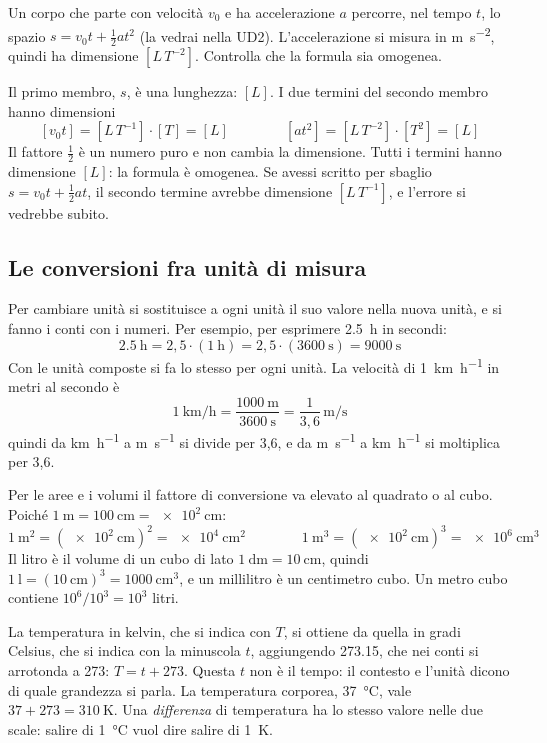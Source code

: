 \begin{esempio}
Un corpo che parte con velocità $v_0$ e ha accelerazione $a$ percorre, nel tempo $t$, lo spazio $s = v_0 t + \frac{1}{2} a t^{2}$ (la vedrai nella UD2). L'accelerazione si misura in \si{\metre\per\second\squared}, quindi ha dimensione $[L\,T^{-2}]$. Controlla che la formula sia omogenea.

Il primo membro, $s$, è una lunghezza: $[L]$. I due termini del secondo membro hanno dimensioni
\[
  [v_0 t] = [L\,T^{-1}] \cdot [T] = [L]
  \qquad\qquad
  [a t^{2}] = [L\,T^{-2}] \cdot [T^{2}] = [L]
\]
Il fattore $\frac{1}{2}$ è un numero puro e non cambia la dimensione. Tutti i termini hanno dimensione $[L]$: la formula è omogenea. Se avessi scritto per sbaglio $s = v_0 t + \frac{1}{2} a t$, il secondo termine avrebbe dimensione $[L\,T^{-1}]$, e l'errore si vedrebbe subito.
\end{esempio}

\subsection{Le conversioni fra unità di misura}

Per cambiare unità si sostituisce a ogni unità il suo valore nella nuova unità, e si fanno i conti con i numeri. Per esempio, per esprimere \SI{2,5}{\hour} in secondi:
\[
  \SI{2,5}{\hour} = 2{,}5 \cdot (\SI{1}{\hour}) = 2{,}5 \cdot (\SI{3600}{\second}) = \SI{9000}{\second}
\]
Con le unità composte si fa lo stesso per ogni unità. La velocità di \SI{1}{\kilo\metre\per\hour} in metri al secondo è
\[
  \SI{1}{\kilo\metre\per\hour} = \frac{\SI{1000}{\metre}}{\SI{3600}{\second}} = \frac{1}{3{,}6}\,\si{\metre\per\second}
\]
quindi da \si{\kilo\metre\per\hour} a \si{\metre\per\second} si divide per 3,6, e da \si{\metre\per\second} a \si{\kilo\metre\per\hour} si moltiplica per 3,6.

Per le aree e i volumi il fattore di conversione va elevato al quadrato o al cubo. Poiché $\SI{1}{\metre} = \SI{100}{\centi\metre} = \SI{e2}{\centi\metre}$:
\[
  \SI{1}{\metre\squared} = (\SI{e2}{\centi\metre})^{2} = \SI{e4}{\centi\metre\squared}
  \qquad\qquad
  \SI{1}{\metre\cubed} = (\SI{e2}{\centi\metre})^{3} = \SI{e6}{\centi\metre\cubed}
\]
Il litro è il volume di un cubo di lato $\SI{1}{\deci\metre} = \SI{10}{\centi\metre}$, quindi $\SI{1}{\litre} = (\SI{10}{\centi\metre})^{3} = \SI{1000}{\centi\metre\cubed}$, e un millilitro è un centimetro cubo. Un metro cubo contiene $10^{6}/10^{3} = 10^{3}$ litri.

La temperatura in kelvin, che si indica con $T$, si ottiene da quella in gradi Celsius, che si indica con la minuscola $t$, aggiungendo \num{273,15}, che nei conti si arrotonda a 273: $T = t + 273$. Questa $t$ non è il tempo: il contesto e l'unità dicono di quale grandezza si parla. La temperatura corporea, \SI{37}{\celsius}, vale $37 + 273 = \SI{310}{\kelvin}$. Una \emph{differenza} di temperatura ha lo stesso valore nelle due scale: salire di \SI{1}{\celsius} vuol dire salire di \SI{1}{\kelvin}.

